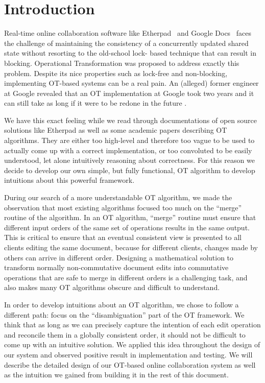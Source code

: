 \section{Introduction}

Real-time online collaboration software like Etherpad~\cite{etherpad} and Google Docs~\cite{gdocs}
faces the challenge of maintaining the consistency of a concurrently updated shared state without
resorting to the old-school lock- based technique that can result in blocking. Operational
Transformation \cite{sun1998operational} was proposed to address exactly this problem. Despite its
nice properties such as lock-free and non-blocking, implementing OT-based systems can be a real
pain. An (alleged) former engineer at Google revealed that an OT implementation at Google took two
years and it can still take as long if it were to be redone in the future \cite{sharejs}.

We have this exact feeling while we read through documentations of open source solutions like
Etherpad as well as some academic papers describing OT algorithms. They are either too high-level
and therefore too vague to be used to actually come up with a correct implementation, or too
convoluted to be easily understood, let alone intuitively reasoning about correctness. For this
reason we decide to develop our own simple, but fully functional, OT algorithm to develop intuitions
about this powerful framework.

During our search of a more understandable OT algorithm, we made the observation that most existing
algorithms focused too much on the ``merge'' routine of the algorithm. In an OT algorithm, ``merge''
routine must ensure that different input orders of the same set of operations results in the same
output. This is critical to ensure that an eventual consistent view is presented to all clients
editing the same document, because for different clients, changes made by others can arrive in
different order. Designing a mathematical solution to transform normally non-commutative document
edits into commutative operations that are safe to merge in different orders is a challenging task,
and also makes many OT algorithms obscure and difficult to understand.

In order to develop intuitions about an OT algorithm, we chose to follow a different path: focus on
the ``disambiguation'' part of the OT framework. We think that as long as we can precisely capture
the intention of each edit operation and reconcile them in a globally consistent order, it should
not be difficult to come up with an intuitive solution. We applied this idea throughout the design
of our system and observed positive result in implementation and testing. We will describe the
detailed design of our OT-based online collaboration system as well as the intuition we gained from
building it in the rest of this document.
